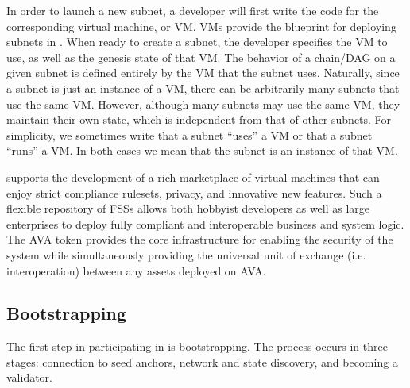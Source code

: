 \documentclass[runningheads]{llncs}
\begin{document}
In order to launch a new subnet, a developer will first write the code for the corresponding virtual machine, or VM. 
VMs provide the blueprint for deploying subnets in \AVAPlatformName{}. 
When ready to create a subnet, the developer specifies the VM to use, as well as the genesis state of that VM. The behavior of a chain/DAG on a given subnet is defined entirely by the VM that the subnet uses. Naturally, since a subnet is just an instance of a VM, there can be arbitrarily many subnets that use the same VM. However, although many subnets may use the same VM, they maintain their own state, which is independent from that of other subnets. For simplicity, we sometimes write that a subnet ``uses'' a VM or that a subnet ``runs'' a VM. In both cases we mean that the subnet is an instance of that VM.

\AVAPlatformName{} supports the development of a rich marketplace of virtual machines that can enjoy strict compliance rulesets, privacy, and innovative new features. Such a flexible repository of FSSs allows both hobbyist developers as well as large enterprises to deploy fully compliant and interoperable business and system logic. The AVA token provides the core infrastructure for enabling the security of the system while simultaneously providing the universal unit of exchange (i.e. interoperation) between any assets deployed on AVA. 



\subsection{Bootstrapping}
The first step in participating in \AVAPlatformName{} is bootstrapping. The process occurs in three stages: connection to seed anchors, network and state discovery, and becoming a validator. 
\end{document}
